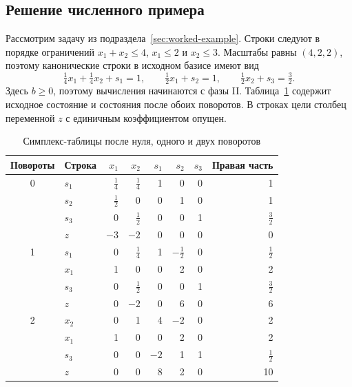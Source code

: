 \subsection{Решение численного примера}

Рассмотрим задачу из подраздела~\ref{sec:worked-example}.
Строки следуют в порядке ограничений $x_1+x_2\leq4$, $x_1\leq2$
и $x_2\leq3$. Масштабы равны $(4,2,2)$, поэтому канонические строки
в исходном базисе имеют вид
\begin{equation}
  \tfrac14 x_1+\tfrac14 x_2+s_1=1,\qquad
  \tfrac12 x_1+s_2=1,\qquad
  \tfrac12 x_2+s_3=\tfrac32 .
  \label{eq:simplex-example-initial}
\end{equation}
Здесь $b\geq0$, поэтому вычисления начинаются с фазы II.
Таблица~\ref{tab:simplex-example-pivots} содержит исходное состояние
и состояния после обоих поворотов. В строках цели столбец переменной
$z$ с единичным коэффициентом опущен.

\begin{table}[htbp]
  \caption{Симплекс-таблицы после нуля, одного и двух поворотов}
  \label{tab:simplex-example-pivots}
  \centering
  \begin{tabular}{clrrrrrr}
    \toprule
    Повороты & Строка & $x_1$ & $x_2$ & $s_1$ & $s_2$ & $s_3$
      & Правая часть \\
    \midrule
    0 & $s_1$ & $\tfrac14$ & $\tfrac14$ & 1 & 0 & 0 & 1 \\
      & $s_2$ & $\tfrac12$ & 0 & 0 & 1 & 0 & 1 \\
      & $s_3$ & 0 & $\tfrac12$ & 0 & 0 & 1 & $\tfrac32$ \\
      & $z$ & $-3$ & $-2$ & 0 & 0 & 0 & 0 \\
    \midrule
    1 & $s_1$ & 0 & $\tfrac14$ & 1 & $-\tfrac12$ & 0 & $\tfrac12$ \\
      & $x_1$ & 1 & 0 & 0 & 2 & 0 & 2 \\
      & $s_3$ & 0 & $\tfrac12$ & 0 & 0 & 1 & $\tfrac32$ \\
      & $z$ & 0 & $-2$ & 0 & 6 & 0 & 6 \\
    \midrule
    2 & $x_2$ & 0 & 1 & 4 & $-2$ & 0 & 2 \\
      & $x_1$ & 1 & 0 & 0 & 2 & 0 & 2 \\
      & $s_3$ & 0 & 0 & $-2$ & 1 & 1 & $\tfrac12$ \\
      & $z$ & 0 & 0 & 8 & 2 & 0 & 10 \\
    \bottomrule
  \end{tabular}
\end{table}

